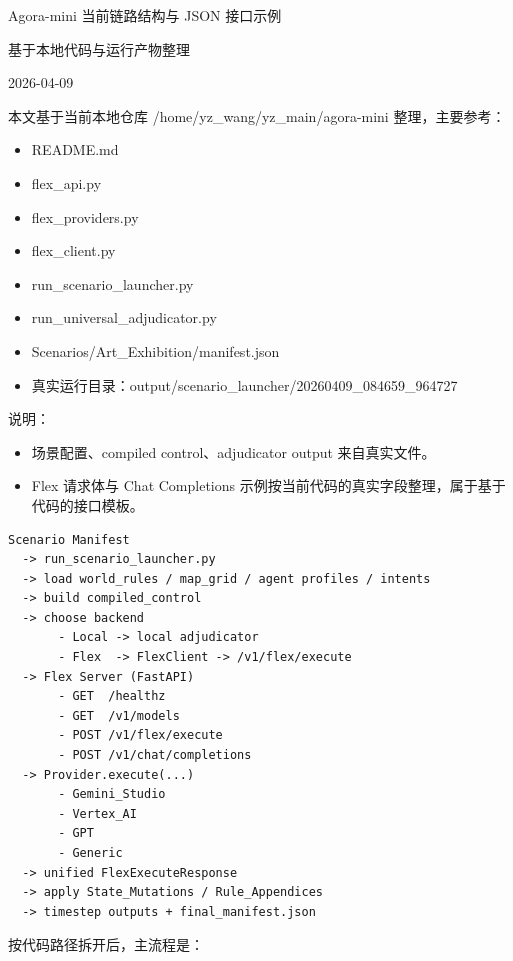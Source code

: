 \documentclass[11pt,a4paper]{article}
\newcommand{\sect}[1]{\vspace{8pt}{\sectionfont #1}\par}
\newcommand{\code}[1]{{\smallmono #1}}
\begin{document}
\mainfont

\begin{center}
{\titlefont Agora-mini 当前链路结构与 JSON 接口示例}\par
基于本地代码与运行产物整理\par
2026-04-09
\end{center}

\sect{1. 说明}
本文基于当前本地仓库 \code{/home/yz\_wang/yz\_main/agora-mini} 整理，主要参考：

\begin{itemize}
\item \code{README.md}
\item \code{flex\_api.py}
\item \code{flex\_providers.py}
\item \code{flex\_client.py}
\item \code{run\_scenario\_launcher.py}
\item \code{run\_universal\_adjudicator.py}
\item \code{Scenarios/Art\_Exhibition/manifest.json}
\item 真实运行目录：\code{output/scenario\_launcher/20260409\_084659\_964727}
\end{itemize}

说明：

\begin{itemize}
\item 场景配置、compiled control、adjudicator output 来自真实文件。
\item Flex 请求体与 Chat Completions 示例按当前代码的真实字段整理，属于基于代码的接口模板。
\end{itemize}

\sect{2. 当前链路结构}

\begin{verbatim}
Scenario Manifest
  -> run_scenario_launcher.py
  -> load world_rules / map_grid / agent profiles / intents
  -> build compiled_control
  -> choose backend
       - Local -> local adjudicator
       - Flex  -> FlexClient -> /v1/flex/execute
  -> Flex Server (FastAPI)
       - GET  /healthz
       - GET  /v1/models
       - POST /v1/flex/execute
       - POST /v1/chat/completions
  -> Provider.execute(...)
       - Gemini_Studio
       - Vertex_AI
       - GPT
       - Generic
  -> unified FlexExecuteResponse
  -> apply State_Mutations / Rule_Appendices
  -> timestep outputs + final_manifest.json
\end{verbatim}

按代码路径拆开后，主流程是：
\end{document}

